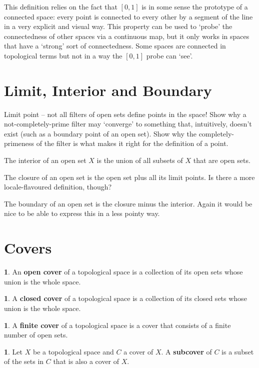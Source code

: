 \documentclass[oneside,english]{amsbook}
\numberwithin{section}{chapter}
\theoremstyle{plain}
\theoremstyle{definition}
\newtheorem{defn}[thm]{\protect\definitionname}
\providecommand{\definitionname}{Definition}
\begin{document}
This definition relies on the fact that $[0, 1]$ is in some sense the prototype of a connected space: every point is connected to every other by a segment of the line in a very explicit and visual way. This property can be used to `probe' the connectedness of other spaces via a continuous map, but it only works in spaces that have a `strong' sort of connectedness. Some spaces are connected in topological terms but not in a way the $[0, 1]$ probe can `see'.

\section{Limit, Interior and Boundary}

Limit point -- not all filters of open sets define points in the space! Show why a not-completely-prime filter may `converge' to something that, intuitively, doesn't exist (such as a boundary point of an open set). Show why the completely-primeness of the filter is what makes it right for the definition of a point.

The interior of an open set $X$ is the union of all subsets of $X$ that are open sets.

The closure of an open set is the open set plus all its limit points. Is there a more locale-flavoured definition, though?

The boundary of an open set is the closure minus the interior. Again it would be nice to be able to express this in a less pointy way.
	
\section{Covers}

\begin{defn}
	An \textbf{open cover} of a topological space is a collection of its open sets whose union is the whole space.
\end{defn}

\begin{defn}
	A \textbf{closed cover} of a topological space is a collection of its closed sets whose union is the whole space.
\end{defn}

\begin{defn}
	A \textbf{finite cover} of a topological space is a cover that consists of a finite number of open sets.
\end{defn}

\begin{defn}
	Let $X$ be a topological space and $C$ a cover of $X$. A \textbf{subcover} of $C$ is a subset of the sets in $C$ that is also a cover of $X$.
\end{defn}
\end{document}
